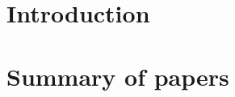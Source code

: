\documentclass[a4paper,12pt,twoside,openright]{chalmersthesis}
\begin{document}
\maketitle



\tableofcontents
\clearpage{\pagestyle{plain}\cleardoublepage}

%

\chapter{\label{chap:introduction}Introduction}
\lipsum[6-8] \cite{Kenfack2004Aug}

\chapter{\label{chap:Summary}Summary of papers}
\lipsum[6-8]

%
\cleardoublepage
{}
{}


%
\cleardoublepage
\appendix


%

\end{document}

